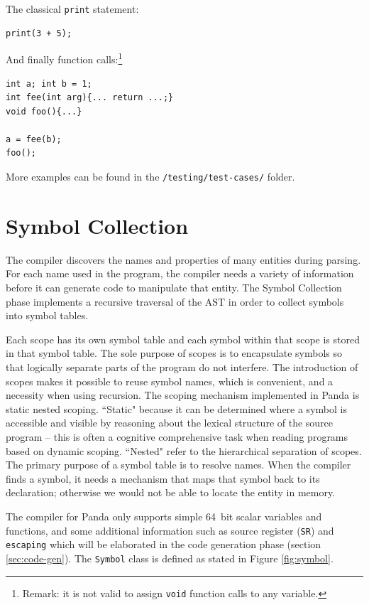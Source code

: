 The classical \texttt{print} statement:

\begin{verbatim}
print(3 + 5); 
\end{verbatim}

And finally function calls:\footnote{Remark: it is not valid to assign \texttt{void} function calls to any variable.}

\begin{verbatim}
int a; int b = 1;
int fee(int arg){... return ...;}
void foo(){...}

a = fee(b);
foo();
\end{verbatim}

More examples can be found in the \texttt{/testing/test-cases/} folder.

\newpage

\section{Symbol Collection}\label{sec:symbol_collection}
The compiler discovers the names and properties of many entities during parsing. For each name used in the program, the compiler needs a variety of information before it can generate code to manipulate that entity. The Symbol Collection phase implements a recursive traversal of the AST in order to collect symbols into symbol tables.

Each scope has its own symbol table and each symbol within that scope is stored in that symbol table. The sole purpose of scopes is to encapsulate symbols so that logically separate parts of the program do not interfere. The introduction of scopes makes it possible to reuse symbol names, which is convenient, and a necessity when using recursion. The scoping mechanism implemented in Panda is static nested scoping. ``Static" because it can be determined where a symbol is accessible and visible by reasoning about the lexical structure of the source program -- this is often a cognitive comprehensive task when reading programs based on dynamic scoping. ``Nested" refer to the hierarchical separation of scopes. The primary purpose of a symbol table is to resolve names. When the compiler finds a symbol, it needs a mechanism that maps that symbol back to its declaration; otherwise we would not be able to locate the entity in memory.

The compiler for Panda only supports simple \SI{64}{bit} scalar variables and functions, and some additional information such as source register (\texttt{SR}) and \texttt{escaping} which will be elaborated in the code generation phase (section \ref{sec:code-gen}). The \texttt{Symbol} class is defined as stated in Figure \ref{fig:symbol}.

